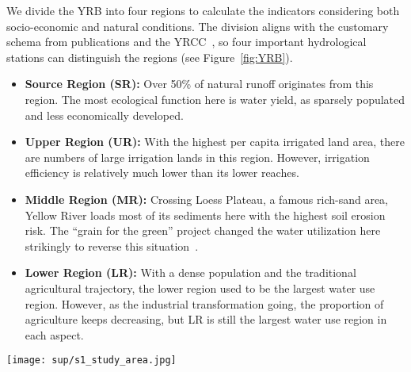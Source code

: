 We divide the YRB into four regions to calculate the indicators considering both socio-economic and natural conditions. The division aligns with the customary schema from publications and the YRCC~\cite{yellowriverconservancycommission2013,wang2019c,wang2016e}, so four important hydrological stations can distinguish the regions (see Figure~\ref{fig:YRB}).

\begin{itemize}
    \item \textbf{Source Region (SR):} Over 50\% of natural runoff originates from this region. The most ecological function here is water yield, as sparsely populated and less economically developed.
    \item \textbf{Upper Region (UR):} With the highest per capita irrigated land area, there are numbers of large irrigation lands in this region. However, irrigation efficiency is relatively much lower than its lower reaches.
    \item \textbf{Middle Region (MR):} Crossing Loess Plateau, a famous rich-sand area, Yellow River loads most of its sediments here with the highest soil erosion risk. The ``grain for the green'' project changed the water utilization here strikingly to reverse this situation~\cite{wu2020a}.
    \item \textbf{Lower Region (LR):} With a dense population and the traditional agricultural trajectory, the lower region used to be the largest water use region. However, as the industrial transformation going, the proportion of agriculture keeps decreasing, but LR is still the largest water use region in each aspect.
\end{itemize}

\begin{figure*}[hbtp!]
    \centering
    \texttt{[image: sup/s1\_study\_area.jpg]}
    \caption{
        The study area.
        \textbf{A.} Diagram of the YRB and the subdivision of the basin (SR: Source Region, UR: Upper Region, MR: Middle Region, DR: Downstream region).
        \textbf{B.} Profile of the main channel of the Yellow River. The hydrological stations control the SR, UR, MR and DR.
        \textbf{C.} Typical landscapes in different regions in the YRB.
    }\label{fig:YRB}
\end{figure*}

